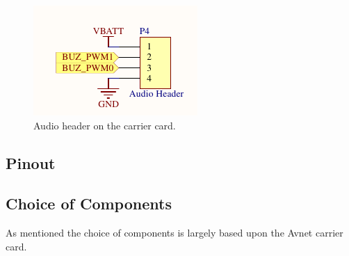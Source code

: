 \begin{figure}
	\centering
	\includegraphics[width=0.4\linewidth]{graphics/audio_header.pdf}
	\caption{Audio header on the carrier card.}
	\label{fig:audio_header}
\end{figure}



\subsection{Pinout}

\subsection{Choice of Components}
As mentioned the choice of components is largely based upon the Avnet carrier card.